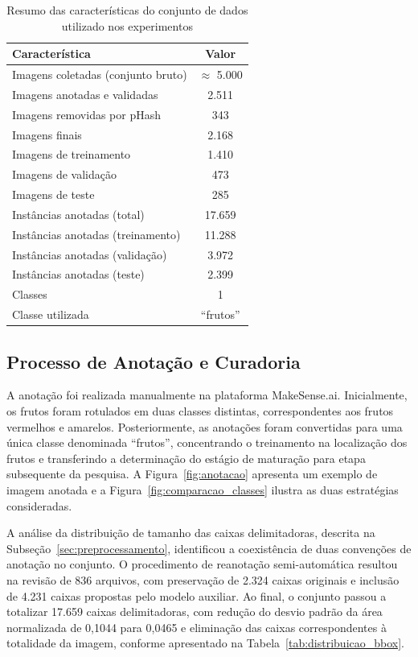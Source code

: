 \documentclass[artigo,times,capa]{iftex2024}
\begin{document}
\begin{table}[htbp]
\centering
\caption{Resumo das características do conjunto de dados utilizado nos experimentos}
\label{tab:estatisticas_dataset}
\begin{tabular}{lc}
\toprule
\textbf{Característica} & \textbf{Valor} \\
\midrule
Imagens coletadas (conjunto bruto) & $\approx$ 5.000 \\
Imagens anotadas e validadas & 2.511 \\
Imagens removidas por pHash & 343 \\
Imagens finais & 2.168 \\
Imagens de treinamento & 1.410 \\
Imagens de validação & 473 \\
Imagens de teste & 285 \\
Instâncias anotadas (total) & 17.659 \\
Instâncias anotadas (treinamento) & 11.288 \\
Instâncias anotadas (validação) & 3.972 \\
Instâncias anotadas (teste) & 2.399 \\
Classes & 1 \\
Classe utilizada & ``frutos'' \\
\bottomrule
\end{tabular}
\end{table}

\subsection{Processo de Anotação e Curadoria}

A anotação foi realizada manualmente na plataforma MakeSense.ai. Inicialmente,
os frutos foram rotulados em duas classes distintas, correspondentes aos frutos
vermelhos e amarelos. Posteriormente, as anotações foram convertidas para uma
única classe denominada ``frutos'', concentrando o treinamento na
localização dos frutos e transferindo a determinação do estágio de maturação
para etapa subsequente da pesquisa. A Figura~\ref{fig:anotacao} apresenta um exemplo
de imagem anotada e a Figura~\ref{fig:comparacao_classes} ilustra as duas
estratégias consideradas.

A análise da distribuição de tamanho das caixas delimitadoras, descrita na
Subseção~\ref{sec:preprocessamento}, identificou a coexistência de duas
convenções de anotação no conjunto. O procedimento de reanotação
semi-automática resultou na revisão de 836 arquivos, com preservação de 2.324
caixas originais e inclusão de 4.231 caixas propostas pelo modelo auxiliar. Ao
final, o conjunto passou a totalizar 17.659 caixas delimitadoras, com redução do
desvio padrão da área normalizada de 0,1044 para 0,0465 e eliminação das caixas
correspondentes à totalidade da imagem, conforme apresentado na
Tabela~\ref{tab:distribuicao_bbox}.
\end{document}

